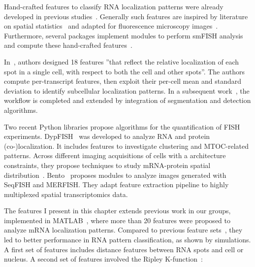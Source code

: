 Hand-crafted features to classify \ac{RNA} localization patterns were already developed in previous studies~\cite{battich_image-based_2013,samacoits_computational_2018}.
Generally such features are inspired by literature on spatial statistics~\cite{ripley2005spatial} and adapted for fluorescence microscopy images~\cite{lagache_statistical_2015,stueland_rdi_2019}.
Furthermore, several packages implement modules to perform \ac{smFISH} analysis and compute these hand-crafted features~\cite{mueller_fish-quant_2013,savulescu_dypfish_2019,mah_bento_2022}.

In~\cite{battich_image-based_2013}, authors designed 18 features ''that reflect the relative localization of each spot in a single cell, with respect to both the cell and other spots''.
The authors compute per-transcript features, then exploit their per-cell mean and standard deviation to identify subcellular localization patterns.
In a subsequent work~\cite{stoeger_computer_2015}, the workflow is completed and extended by integration of segmentation and detection algorithms.

Two recent Python libraries propose algorithms for the quantification of \ac{FISH} experiments.
DypFISH~\cite{savulescu_dypfish_2019} was developed to analyze \ac{RNA} and protein (co-)localization.
It includes features to investigate clustering and \ac{MTOC}-related patterns.
Across different imaging acquisitions of cells with a architecture constraints, they propose techniques to study \ac{mRNA}-protein spatial distribution~\cite{savulescu_interrogating_2021}.
Bento~\cite{mah_bento_2022} proposes modules to analyze images generated with \ac{SeqFISH} and \ac{MERFISH}.
They adapt feature extraction pipeline to highly multiplexed spatial transcriptomics data.

The features I present in this chapter extends previous work in our groups, implemented in MATLAB~\cite{mueller_fish-quant_2013, samacoits_computational_2018}, where more than 20 features were proposed to analyze mRNA localization patterns. 
Compared to previous feature sets~\cite{battich_image-based_2013}, they led to better performance in \ac{RNA} pattern classification, as shown by simulations.  
A first set of features includes distance features between \ac{RNA} spots and cell or nucleus.
A second set of features involved the Ripley K-function~\cite{ripley2005spatial}:

